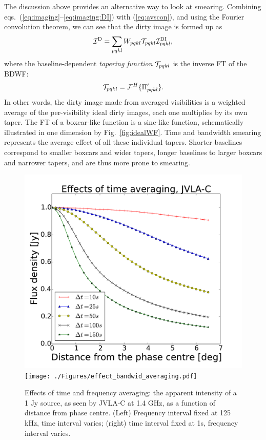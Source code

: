 \documentclass[useAMS,usenatbib]{mn2e}
\begin{document}
The discussion above provides an alternative way to look at smearing. Combining eqs.~(\ref{eq:imaging}--\ref{eq:imaging:DI}) with 
(\ref{eq:avscon}), and using the Fourier convolution theorem, we can see that the dirty image is formed up as
\begin{equation}
\mathcal{I}^\mathrm{D} =  \sum_{pqkl} W_{pqkl}  \mathcal{T}_{pqkl} \mathcal{I}^\mathrm{DI}_{pqkl},
\end{equation}
where the baseline-dependent \emph{tapering function} $\mathcal{T}_{pqkl}$ is the inverse FT of the BDWF:
\begin{equation}
\mathcal{T}_{pqkl} = \mathcal{F}^H\{ \Pi^{\prime}_{pqkl} \}.
\end{equation}
In other words, the dirty image made from averaged visibilities is a weighted average of the per-visibility ideal dirty images, 
each one multiplies by its own taper. The FT of a boxcar-like function is a sinc-like function, schematically illustrated in one
dimension by Fig.~\ref{fig:idealWF}. Time and bandwidth smearing represents the average effect 
of all these individual tapers. Shorter baselines correspond to smaller boxcars and wider tapers, longer baselines to larger 
boxcars and narrower tapers, and are thus more prone to smearing.

\begin{figure}
\includegraphics[width=\columnwidth]{./Figures/effect_time_averaging.pdf}%
\texttt{[image: ./Figures/effect\_bandwid\_averaging.pdf]}
\caption{Effects of time and frequency averaging: the apparent intensity of a 1 Jy source, as seen by JVLA-C at 1.4 GHz, 
as a function of distance from phase centre. (Left) Frequency interval fixed at 125 kHz, time interval varies; 
(right) time interval fixed at 1s, frequency interval varies.}\label{fig:smear}
\end{figure}
\end{document}
